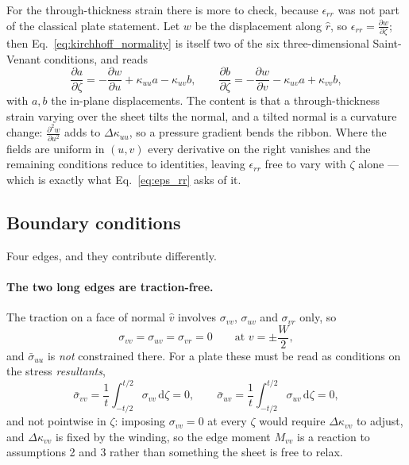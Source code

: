 \documentclass[11pt]{article}
\begin{document}
For the through-thickness strain there is more to check, because
$\epsilon_{rr}$ was not part of the classical plate statement. Let $w$ be the
displacement along $\hat r$, so $\epsilon_{rr} = \frac{\partial w}
{\partial \zeta}$; then Eq.~\eqref{eq:kirchhoff_normality} is itself two of the
six three-dimensional Saint-Venant conditions, and reads
\begin{equation}\label{eq:normality_compat}
    \frac{\partial a}{\partial \zeta} = -\frac{\partial w}{\partial u}
      + \kappa_{uu}a - \kappa_{uv}b,
    \qquad
    \frac{\partial b}{\partial \zeta} = -\frac{\partial w}{\partial v}
      - \kappa_{uv}a + \kappa_{vv}b,
\end{equation}
with $a, b$ the in-plane displacements. The content is that a through-thickness
strain varying over the sheet tilts the normal, and a tilted normal is a
curvature change: $\frac{\partial^{2} w}{\partial u^{2}}$ adds to
$\Delta\kappa_{uu}$, so a pressure gradient bends the ribbon. Where the fields
are uniform in $(u,v)$ every derivative on the right vanishes and the remaining
conditions reduce to identities, leaving $\epsilon_{rr}$ free to vary with
$\zeta$ alone --- which is exactly what Eq.~\eqref{eq:eps_rr} asks of it.

\subsection{Boundary conditions}\label{sec:bcs}
Four edges, and they contribute differently.

\paragraph{The two long edges are traction-free.} The traction on a face of
normal $\hat v$ involves $\sigma_{vv}$, $\sigma_{uv}$ and $\sigma_{vr}$ only, so
\begin{equation}\label{eq:edge_free}
    \sigma_{vv} = \sigma_{uv} = \sigma_{vr} = 0
    \qquad\text{at } v = \pm\frac{W}{2},
\end{equation}
and $\bar\sigma_{uu}$ is \emph{not} constrained there. For a plate these must be
read as conditions on the stress \emph{resultants},
\begin{equation}\label{eq:edge_resultants}
    \boxed{\;\bar\sigma_{vv}
      = \frac{1}{t}\int_{-t/2}^{t/2}\sigma_{vv}\,\mathrm d\zeta = 0,
    \qquad
    \bar\sigma_{uv}
      = \frac{1}{t}\int_{-t/2}^{t/2}\sigma_{uv}\,\mathrm d\zeta = 0,\;}
\end{equation}
and not pointwise in $\zeta$: imposing $\sigma_{vv} = 0$ at every $\zeta$ would
require $\Delta\kappa_{vv}$ to adjust, and $\Delta\kappa_{vv}$ is fixed by the
winding, so the edge moment $M_{vv}$ is a reaction to assumptions 2 and 3 rather
than something the sheet is free to relax.
\end{document}

